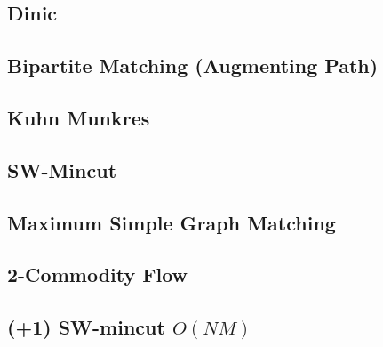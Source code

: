 \documentclass[10pt,twocolumn,oneside]{article}
\begin{document}
\subsection{Dinic} %


\subsection{Bipartite Matching (Augmenting Path)}


\subsection{Kuhn Munkres}


\subsection{SW-Mincut}


\subsection{Maximum Simple Graph Matching}


%


\subsection{2-Commodity Flow}


%

\subsection{(+1) SW-mincut $O(NM)$}

\end{document}
